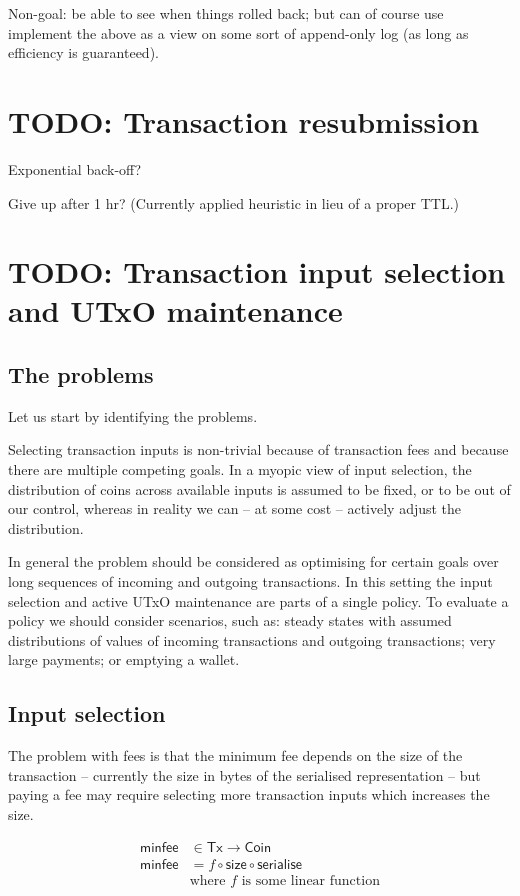 \documentclass{article}
\theoremstyle{definition}{
  \newtheorem{lemma}{Lemma}[section] %
  \newtheorem{definition}[lemma]{Definition}
}
\theoremstyle{theorem}{
  \newtheorem{invariant}[lemma]{Invariant}
  \newtheorem{proofobligation}[lemma]{Proof Obligation}
}
\numberwithin{equation}{lemma}
\begin{document}
Non-goal: be able to see when things rolled back; but can of course use
implement the above as a view on some sort of append-only log
(as long as efficiency is guaranteed).

\section{TODO: Transaction resubmission}

Exponential back-off?

Give up after 1 hr? (Currently applied heuristic in lieu of a proper TTL.)

\section{TODO: Transaction input selection and UTxO maintenance}

\subsection{The problems}

Let us start by identifying the problems.

Selecting transaction inputs is non-trivial because of transaction fees and
because there are multiple competing goals. In a myopic view of input
selection, the distribution of coins across available inputs is assumed to be
fixed, or to be out of our control, whereas in reality we can -- at some cost
-- actively adjust the distribution.

In general the problem should be considered as optimising for certain goals
over long sequences of incoming and outgoing transactions. In this setting
the input selection and active UTxO maintenance are parts of a single policy.
To evaluate a policy we should consider scenarios, such as: steady states with
assumed distributions of values of incoming transactions and outgoing
transactions; very large payments; or emptying a wallet.

\subsection{Input selection}

The problem with fees is that the minimum fee depends on the size of the transaction
-- currently the size in bytes of the serialised representation -- but paying a
fee may require selecting more transaction inputs which increases the size.

\begin{equation}
\begin{split}
\mathsf{minfee} & \in \mathsf{Tx} \to \mathsf{Coin} \\
\mathsf{minfee} & = f \circ \mathsf{size} \circ \mathsf{serialise} \\
             & \text{where } f \text{ is some linear function}
\end{split}
\end{equation}
\end{document}
